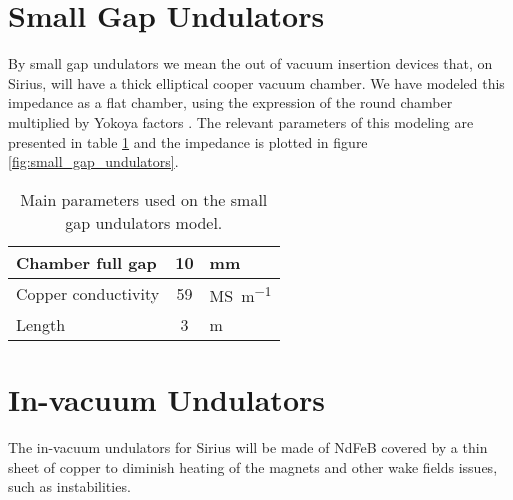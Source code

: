

\section{Small Gap Undulators}

By small gap undulators we mean the out of vacuum insertion devices that, on Sirius, will have a thick elliptical cooper vacuum chamber. We have modeled this impedance as a flat chamber, using the expression of the round chamber multiplied by Yokoya factors \cite{yokoya1993, gluckstern1993}. The relevant parameters of this modeling are presented in table \ref{tab:small_gap_undulators} and the impedance is plotted in figure \ref{fig:small_gap_undulators}.

\begin{table}[!t]
 \centering
 \caption{Main parameters used on the small gap undulators model.}
 \label{tab:small_gap_undulators}
 \begin{tabular}{lcl}\hline
  Chamber full gap      & 10               & \si{\milli\meter} \\\hline
  Copper conductivity\cite{matwebsite} & 59& \si{\mega\siemens\per\meter} \\\hline
  Length                & 3                & \si{\meter}   \\\hline
 \end{tabular}
\end{table}



\section{In-vacuum Undulators}\label{sec:in-vacuum_undulators}

The in-vacuum undulators for Sirius will be made of NdFeB covered by a thin sheet of copper to diminish heating of the magnets and other wake fields issues, such as instabilities.

